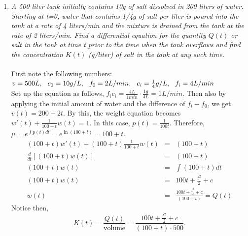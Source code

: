 \documentclass[10pt]{article}
\begin{document}
        \begin{enumerate}
            \item {\it A 500 liter tank initially contains 10g of salt dissolved in 200 liters of water. Starting at t=0, water that contains 1/4g of salt per liter is poured into the tank at a rate of 4 liters/min and the mixture is drained from the tank at the rate of 2 liters/min. Find a differential equation for the quantity $Q(t)$ or salt in the tank at time t prior to the time when the tank overflows and find the concentration $K(t)$ (g/liter) of salt in the tank at any such time.}\\ \\
            First note the following numbers:\\
            $v=500 L,\hspace{.25cm} c_0=10 g/L, \hspace{.25cm}f_0=2 L/min, \hspace{.25cm}c_i=\frac{1}{4} g/L, \hspace{.25cm}f_i=4 L/min$\\
            Set up the equation as follows, $f_i c_i = \frac{4 L}{1 min}\cdot\frac{1 g}{4 L} = 1 L/min$. Then also by applying the initial amount of water and the difference of $f_i-f_0$, we get $v(t)=200+2t$. By this, the weight equation becomes $w'(t)+\frac{1}{100+t}w(t)=1$. In this case, $p(t)=\frac{1}{100t}$. Therefore, $\mu=e^{\int{p(t)dt}}=e^{\ln{(100+t)}}=100+t$.\\
            \begin{eqnarray*}
                (100+t)w'(t)+(100+t)\frac{1}{100+t}w(t)&=&(100+t)\\
                \frac{d}{dt}[(100+t)w(t)]&=&(100+t)\\
                (100+t)w(t)&=&\int{(100+t)dt}\\
                (100+t)w(t)&=&100t+\frac{t^2}{2}+c\\
                w(t)&=&\frac{100t+\frac{t^2}{2}+c}{(100+t)} = Q(t)
            \end{eqnarray*}
            Notice then, $$K(t)=\frac{Q(t)}{\text{volume}}=\frac{100t+\frac{t^2}{2}+c}{(100+t)\cdot 500}.$$
            

\end{enumerate}
\end{document}
